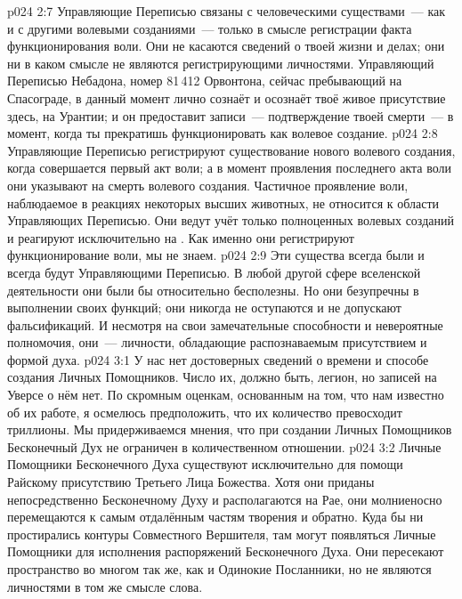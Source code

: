 \vs p024 2:7 \pc Управляющие Переписью связаны с человеческими существами~--- как и с другими волевыми созданиями~--- только в смысле регистрации факта функционирования воли. Они не касаются сведений о твоей жизни и делах; они ни в каком смысле не являются регистрирующими личностями. Управляющий Переписью Небадона, номер 81\,412 Орвонтона, сейчас пребывающий на Спасограде, в данный момент лично сознаёт и осознаёт твоё живое присутствие здесь, на Урантии; и он предоставит записи~--- подтверждение твоей смерти~--- в момент, когда ты прекратишь функционировать как волевое создание.
\vs p024 2:8 Управляющие Переписью регистрируют существование нового волевого создания, когда совершается первый акт воли; а в момент проявления последнего акта воли они указывают на смерть волевого создания. Частичное проявление воли, наблюдаемое в реакциях некоторых высших животных, не относится к области Управляющих Переписью. Они ведут учёт только полноценных волевых созданий и реагируют исключительно на . Как именно они регистрируют функционирование воли, мы не знаем.
\vs p024 2:9 Эти существа всегда были и всегда будут Управляющими Переписью. В любой другой сфере вселенской деятельности они были бы относительно бесполезны. Но они безупречны в выполнении своих функций; они никогда не оступаются и не допускают фальсификаций. И несмотря на свои замечательные способности и невероятные полномочия, они~--- личности, обладающие распознаваемым присутствием и формой духа.
\vs p024 3:1 У нас нет достоверных сведений о времени и способе создания Личных Помощников. Число их, должно быть, легион, но записей на Уверсе о нём нет. По скромным оценкам, основанным на том, что нам известно об их работе, я осмелюсь предположить, что их количество превосходит триллионы. Мы придерживаемся мнения, что при создании Личных Помощников Бесконечный Дух не ограничен в количественном отношении.
\vs p024 3:2 Личные Помощники Бесконечного Духа существуют исключительно для помощи Райскому присутствию Третьего Лица Божества. Хотя они приданы непосредственно Бесконечному Духу и располагаются на Рае, они молниеносно перемещаются к самым отдалённым частям творения и обратно. Куда бы ни простирались контуры Совместного Вершителя, там могут появляться Личные Помощники для исполнения распоряжений Бесконечного Духа. Они пересекают пространство во многом так же, как и Одинокие Посланники, но не являются личностями в том же смысле слова.
